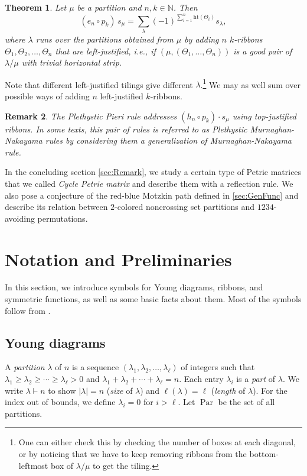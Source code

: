 \documentclass[pdflatex,sn-mathphys-num]{sn-jnl}%
\theoremstyle{thmstyleone}%
\newtheorem{theorem}{Theorem}[section]
\theoremstyle{thmstyletwo}%
\newtheorem{remark}[theorem]{Remark}
\theoremstyle{thmstylethree}%
\numberwithin{equation}{section}
\DeclareMathOperator{\Par}{Par}
\begin{document}
\begin{theorem} \label{thm:plethysticPieri}
Let $\mu$ be a partition and $n, k \in \mathbb{N}$. Then
\[(e_n \circ p_k)\, s_\mu = \sum_{\lambda} (-1)^{\sum_{i=1}^n \text{ht}(\Theta_i)} s_\lambda,\]
where $\lambda$ runs over the partitions obtained from $\mu$ by adding $n$ $k$-ribbons $\Theta_1, \Theta_2, \dots, \Theta_n$ that are left-justified, i.e., if $(\mu,(\Theta_1,\dotsc,\Theta_n))$ is a good pair of $\lambda/\mu$ with trivial horizontal strip. 
\end{theorem}
Note that different left-justified tilings give different $\lambda$.\footnote{One can either check this by checking the number of boxes at each diagonal, or by noticing that we have to keep removing ribbons from the bottom-leftmost box of $\lambda/\mu$ to get the tiling.} We may as well sum over possible ways of adding $n$ left-justified $k$-ribbons.

\begin{remark}
    The Plethystic Pieri rule addresses $(h_n\circ p_k)\cdot s_\mu$ using top-justified ribbons. In some texts, this pair of rules is referred to as \textit{Plethystic Murnaghan-Nakayama rules} by considering them a generalization of Murnaghan-Nakayama rule.
\end{remark}

In the concluding section \cref{sec:Remark}, we study a certain type of Petrie matrices that we called \emph{Cycle Petrie matrix} and describe them with a reflection rule. We also pose a conjecture of the red-blue Motzkin path defined in \cref{sec:GenFunc} and describe its relation between $2$-colored noncrossing set partitions and $1234$-avoiding permutations. 
\bigskip

\section{Notation and Preliminaries}\label{sec:Symbols}
	In this section, we introduce symbols for Young diagrams, ribbons, and symmetric functions, as well as some basic facts about them. Most of the symbols follow from \cite{macdonald1998symmetric}.
	\subsection{Young diagrams}
	A \emph{partition} $\lambda$ of $n$ is a sequence $(\lambda_1,\lambda_2,\dotsc,\lambda_\ell)$ of integers such that $\lambda_1\geq \lambda_2\geq\cdots\geq \lambda_\ell> 0$ and $\lambda_1+\lambda_2+\cdots+\lambda_\ell=n$. Each entry $\lambda_i$ is a \emph{part} of $\lambda$. We write $\lambda \vdash n$ to show $|\lambda|=n$ (\emph{size} of $\lambda$) and $\ell(\lambda)=\ell$ (\emph{length} of $\lambda$). For the index out of bounds, we define $\lambda_{i}=0$ for $i>\ell$. Let $\Par$ be the set of all partitions.
	
\end{document}
